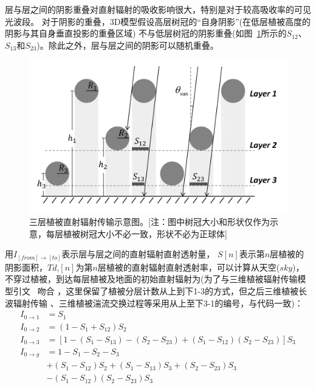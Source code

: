 层与层之间的阴影重叠对直射辐射的吸收影响很大，特别是对于较高吸收率的可见光波段。
对于阴影的重叠，3D模型假设高层树冠的“自身阴影”(在低层植被高度的阴影与其自身垂直投影的重叠区域)
不与低层树冠的阴影重叠(如图~\ref{fig:三层植被结构示意图}所示的$S_{12}$、$S_{13}$和$S_{23}$)。除此之外，层与层之间的阴影可以随机重叠。%
{
\begin{figure}[htbp]
\centering
\includegraphics[width=0.8\columnwidth]{Figures/辐射过程及辐射通量计算/三层植被结构示意图.png}
\caption[三层植被直射辐射传输示意图]{三层植被直射辐射传输示意图。[注：图中树冠大小和形状仅作为示意，每层植被树冠大小不必一致，形状不必为正球体]}
\label{fig:三层植被结构示意图}
\end{figure}
}
用$I_{\left[from\right]\rightarrow\left[to\right]}$表示层与层之间的直射辐射直射透射量，
$S[n]$表示第$n$层植被的阴影面积，$Td$,$[n]$为第$n$层植被的直射辐射直射透射率，可以计算从天空($sky$)，
不穿过植被，到达每层植被及地面的初始直射辐射为(为了与三维植被辐射传输模型引文~\citep{yuan20143d} 吻合
，这里保留了植被分层计数从上到下1-3的方式，但之后三维植被长波辐射传输
、三维植被湍流交换过程等采用从上至下3-1的编号，与代码一致)：
\begin{equation}
\begin{aligned} I_{0 \rightarrow 1} &=S_{1} \\ I_{0 \rightarrow 2} &=\left(1-S_{1}+S_{12}\right) S_{2} \\ 
    I_{0 \rightarrow 3} &=\left[1-\left(S_{1}-S_{13}\right)-\left(S_{2}-S_{23}\right)+\left(S_{1}-S_{12}\right)\left(S_{2}-S_{23}\right)\right] S_{3} \\ 
    I_{0 \rightarrow g} &=1-S_{1}-S_{2}-S_{3} \\ &+\left(S_{1}-S_{12}\right) S_{2}+\left(S_{1}-S_{13}\right) S_{3}+\left(S_{2}-S_{23}\right) S_{3} \\
     &-\left(S_{1}-S_{12}\right)\left(S_{2}-S_{23}\right) S_{3} \end{aligned}
\end{equation}
